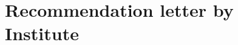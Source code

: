 %
%
\let\textcircled=\pgftextcircled
\chapter{Recommendation letter by Institute}
\label{chap:intro}

